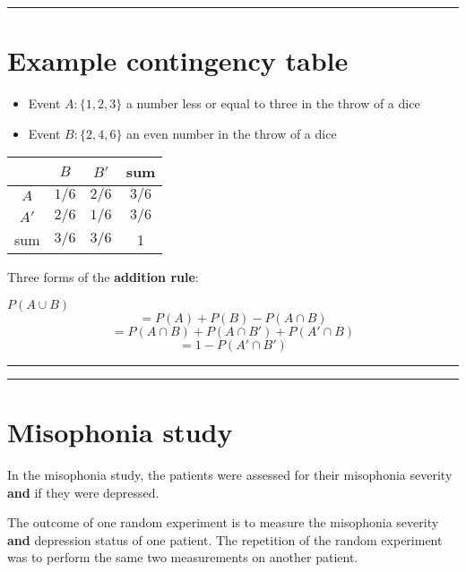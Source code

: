 \documentclass[
]{book}
\providecommand{\tightlist}{%
  \setlength{\itemsep}{0pt}\setlength{\parskip}{0pt}}
\begin{document}
\begin{center}\rule{0.5\linewidth}{0.5pt}\end{center}

\hypertarget{example-contingency-table}{%
\section{Example contingency table}\label{example-contingency-table}}

\begin{itemize}
\tightlist
\item
  Event \(A:\{1,2,3\}\) a number less or equal to three in the throw of a dice\\
\item
  Event \(B:\{2,4,6\}\) an even number in the throw of a dice
\end{itemize}

\begin{longtable}[]{@{}cccc@{}}
\toprule
& \(B\) & \(B'\) & sum \\
\midrule
\endhead
\(A\) & \(1/6\) & \(2/6\) & \(3/6\) \\
\(A'\) & \(2/6\) & \(1/6\) & \(3/6\) \\
sum & \(3/6\) & \(3/6\) & 1 \\
\bottomrule
\end{longtable}

Three forms of the \textbf{addition rule}:

\(P(A \cup B)\)\[=P(A) + P(B) - P(A\cap B)\]
\[=P(A \cap B)+P(A\cap B')+P(A'\cap B)\]
\[=1-P(A'\cap B')\]

\begin{center}\rule{0.5\linewidth}{0.5pt}\end{center}

\begin{center}\rule{0.5\linewidth}{0.5pt}\end{center}

\hypertarget{misophonia-study}{%
\section{Misophonia study}\label{misophonia-study}}

In the misophonia study, the patients were assessed for their misophonia severity \textbf{and} if they were depressed.

The outcome of one random experiment is to measure the misophonia severity \textbf{and} depression status of one patient. The repetition of the random experiment was to perform the same two measurements on another patient.
\end{document}
